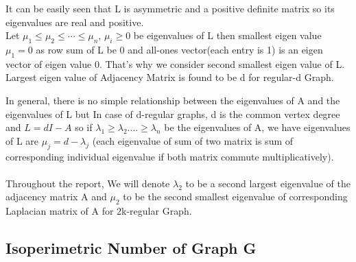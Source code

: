 \documentclass[oneside]{book}
\begin{document}
          It can be easily seen that L is asymmetric and a positive definite  matrix so its eigenvalues are real and positive. \\
         
          Let $\mu_{1} \leq \mu_{2} \leq \cdots \leq \mu_{n}$, $\mu_{i} \geq 0$  be  eigenvalues of L then smallest eigen value $\mu_{1} = 0$ as row sum of L  be 0 and all-ones vector(each entry is 1) is an eigen vector of eigen value 0. That's why we consider second smallest eigen value of L. Largest eigen value of Adjacency Matrix is found to be d for regular-d Graph. \par
          
          
            
         
In general, there is no simple relationship between the eigenvalues of
A and the eigenvalues of L but In case of d-regular graphs, d is the
common vertex degree and $L = dI - A$  so if $\lambda_{1} \geq \lambda_{2}....\geq \lambda_{n}$  be the eigenvalues of A, we have eigenvalues of L are $\mu_{j} = d - \lambda_{j}$ (each eigenvalue of sum of two matrix is sum of corresponding  individual eigenvalue if both matrix commute multiplicatively). \\\\
Throughout the report, We will denote $\lambda_{2} $ to be a second largest eigenvalue of the adjacency matrix A and $\mu_{2}$ to be the second smallest eigenvalue of corresponding Laplacian matrix of A for 2k-regular Graph.  

          
           
         
           \subsection{Isoperimetric Number of Graph G}
           
\end{document}

